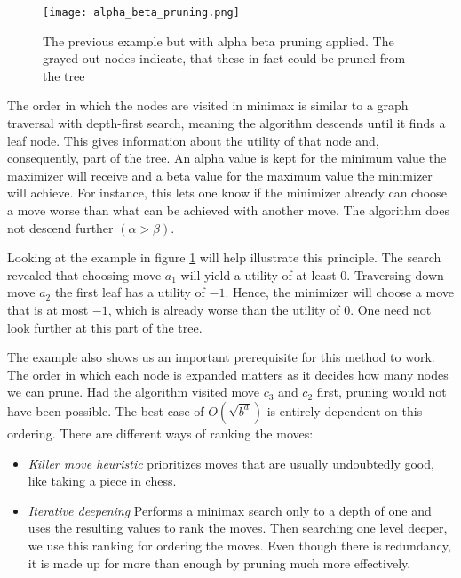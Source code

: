 \begin{figure}
    \centering
    \texttt{[image: alpha\_beta\_pruning.png]}
    \caption{The previous example but with alpha beta pruning applied. The grayed out nodes indicate, that these in fact could be pruned from the tree \cite[cf. p. 308]{russell_artificial_2021}}
    \label{alpha_beta_pruning}
\end{figure}

The order in which the nodes are visited in minimax is similar to a graph traversal with depth-first search, meaning the algorithm descends until it finds a leaf node. This gives information about the utility of that node and, consequently, part of the tree. An alpha value is kept for the minimum value the maximizer will receive and a beta value for the maximum value the minimizer will achieve. For instance, this lets one know if the minimizer already can choose a move worse than what can be achieved with another move. The algorithm does not descend further $ (\alpha > \beta) $.

Looking at the example in figure \ref{alpha_beta_pruning} will help illustrate this principle. The search revealed that choosing move $ a_1 $ will yield a utility of at least $0$. Traversing down move $ a_2 $ the first leaf has a utility of $-1$. Hence, the minimizer will choose a move that is at most $-1$, which is already worse than the utility of $0$. One need not look further at this part of the tree.

The example also shows us an important prerequisite for this method to work. The order in which each node is expanded matters as it decides how many nodes we can prune. Had the algorithm visited move $ c_3 $ and $ c_2 $ first, pruning would not have been possible. The best case of $ O(\sqrt{b^d}) $ is entirely dependent on this ordering. There are different ways of ranking the moves:

\begin{itemize}
    \item \textit{Killer move heuristic} prioritizes moves that are usually undoubtedly good, like taking a piece in chess.
    \item \textit{Iterative deepening} Performs a minimax search only to a depth of one and uses the resulting values to rank the moves. Then searching one level deeper, we use this ranking for ordering the moves. Even though there is redundancy, it is made up for more than enough by pruning much more effectively.
\end{itemize}

